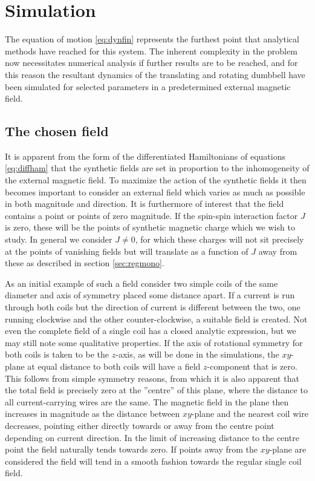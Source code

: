 \documentclass[main.tex]{subfiles}
\begin{document}
\section{Simulation}\label{sec:simulation}
The equation of motion \ref{eq:dynfin} represents the furthest point that analytical
methods have
reached for this system. The inherent complexity in the problem now necessitates numerical
analysis if further results are to be reached, and for this reason the resultant dynamics
of the translating and rotating dumbbell have been simulated for selected parameters in a predetermined external magnetic field.

\subsection{The chosen field}\label{sec:chofield}
It is apparent from the form of the differentiated Hamiltonians of equations
\ref{eq:diffham} that the synthetic fields are
set in proportion to the inhomogeneity of the external magnetic field. To maximize the
action of the synthetic fields it then becomes important to consider an external field
which varies as much as possible in both magnitude and direction. It is furthermore of
interest that the field contains a point or points of zero magnitude. If the spin-spin
interaction factor \(J\) is zero, these will be the points of synthetic magnetic charge
which we wish to study. In general we consider \(J \ne 0\), for which these charges will
not sit precisely at the points of vanishing fields but will translate as a function of
\(J\) away from these as described in section \ref{sec:regmono}.



As an initial example of such a field consider two simple coils of the same diameter and
axis of symmetry placed some distance apart. If a current is run through both coils but
the direction of current is different between the two, one running clockwise and the other
counter-clockwise, a suitable field is created. Not even the complete field of a single
coil has a closed analytic expression, but we may still note some qualitative properties.
If the axis of rotational symmetry for both coils is taken to be the \(z\)-axis, as will be
done in the simulations, the \(xy\)-plane at equal distance to both coils will have a field
\(z\)-component that is zero. This follows from simple symmetry reasons, from which it is
also apparent that the total field is precisely zero at the ''centre'' of this plane, where
the distance to all current-carrying wires are the same. The magnetic field in the plane then increases
in magnitude as the distance between \(xy\)-plane and the nearest coil wire decreases,
pointing either directly towards or away from the centre point depending on current
direction. In the limit of increasing distance to the centre point the field naturally
tends towards zero. If points away from the \(xy\)-plane are considered the field will tend
in a smooth fashion towards the regular single coil field.
\end{document}
